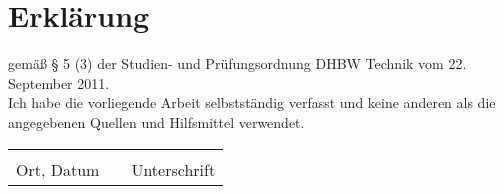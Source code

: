 \chapter*{Erklärung}

gemäß § 5 (3) der \glqq{}Studien- und Prüfungsordnung DHBW Technik\grqq{} vom 22. September 2011.
\\
Ich habe die vorliegende Arbeit selbstständig verfasst und keine anderen als die angegebenen Quellen und Hilfsmittel verwendet.
\vspace{4em}

\begin{tabular}{lp{2em}l}
	\hspace{3cm}   && \hspace{3cm} \\\cline{1-1}\cline{3-3}
	Ort, Datum     && Unterschrift
\end{tabular}